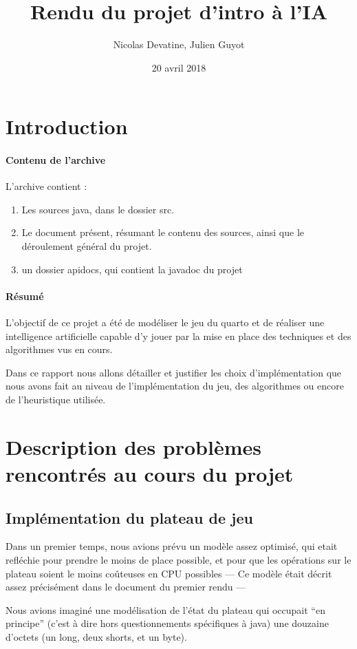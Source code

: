 \documentclass{article}
\author{Nicolas Devatine, Julien Guyot}
\title{Rendu du projet d'intro à l'IA}
\date{20 avril 2018}
\begin{document}
\maketitle
\section{Introduction}

\paragraph{Contenu de l'archive}
L'archive contient : 
\begin{enumerate}
\item Les sources java, dans le dossier src. 
\item Le document présent, résumant le contenu des sources, ainsi que
  le déroulement général du projet.
\item un dossier apidocs, qui contient la javadoc du projet
\end{enumerate}


\paragraph{Résumé}
L’objectif de ce projet a été de modéliser le jeu du quarto 
et de réaliser une intelligence artificielle capable d’y 
jouer par la mise en place des techniques et des algorithmes vus en cours.

Dans ce rapport nous allons détailler et justifier les choix 
d’implémentation que nous avons fait au niveau de l’implémentation du jeu,
 des algorithmes ou encore de l’heuristique utilisée.



\section{Description des problèmes rencontrés au cours du projet}
\subsection{Implémentation du plateau de jeu}
Dans un premier temps, nous avions prévu un modèle assez
optimisé, qui etait refléchie pour prendre le moins de place possible,
et pour que les opérations sur le plateau soient le moins coûteuses en
CPU possibles --- Ce modèle était décrit assez précisément dans le
document du premier rendu ---


Nous avions imaginé une modélisation de l'état du plateau qui occupait
``en principe'' (c'est à dire hors questionnements spécifiques à java)
une douzaine d'octets (un long, deux shorts, et un byte). 
\end{document}
